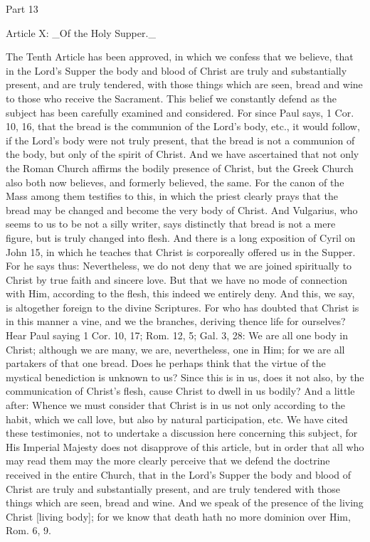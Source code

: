 Part 13


Article X: _Of the Holy Supper._

The Tenth Article has been approved, in which we confess that we
believe, that in the Lord's Supper the body and blood of Christ are
truly and substantially present, and are truly tendered, with those
things which are seen, bread and wine to those who receive the
Sacrament.  This belief we constantly defend as the subject has been
carefully examined and considered.  For since Paul says, 1 Cor. 10,
16, that the bread is the communion of the Lord's body, etc., it
would follow, if the Lord's body were not truly present, that the
bread is not a communion of the body, but only of the spirit of
Christ.  And we have ascertained that not only the Roman Church
affirms the bodily presence of Christ, but the Greek Church also both
now believes, and formerly believed, the same.  For the canon of the
Mass among them testifies to this, in which the priest clearly prays
that the bread may be changed and become the very body of Christ.
And Vulgarius, who seems to us to be not a silly writer, says
distinctly that bread is not a mere figure, but is truly changed into
flesh.  And there is a long exposition of Cyril on John 15, in which
he teaches that Christ is corporeally offered us in the Supper.  For
he says thus: Nevertheless, we do not deny that we are joined
spiritually to Christ by true faith and sincere love.  But that we
have no mode of connection with Him, according to the flesh, this
indeed we entirely deny.  And this, we say, is altogether foreign to
the divine Scriptures.  For who has doubted that Christ is in this
manner a vine, and we the branches, deriving thence life for
ourselves?  Hear Paul saying 1 Cor. 10, 17; Rom. 12, 5; Gal. 3, 28:
We are all one body in Christ; although we are many, we are,
nevertheless, one in Him; for we are all partakers of that one bread.
Does he perhaps think that the virtue of the mystical benediction is
unknown to us?  Since this is in us, does it not also, by the
communication of Christ's flesh, cause Christ to dwell in us bodily?
And a little after: Whence we must consider that Christ is in us not
only according to the habit, which we call love, but also by natural
participation, etc. We have cited these testimonies, not to undertake
a discussion here concerning this subject, for His Imperial Majesty
does not disapprove of this article, but in order that all who may
read them may the more clearly perceive that we defend the doctrine
received in the entire Church, that in the Lord's Supper the body and
blood of Christ are truly and substantially present, and are truly
tendered with those things which are seen, bread and wine.  And we
speak of the presence of the living Christ [living body]; for we know
that death hath no more dominion over Him, Rom. 6, 9.




